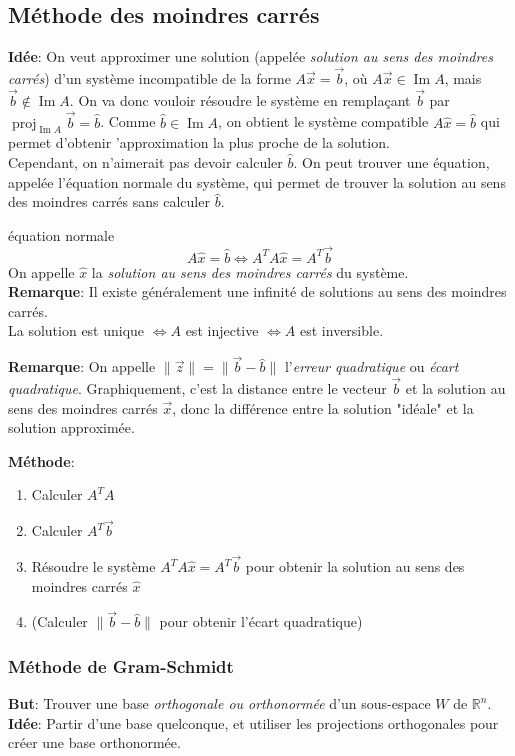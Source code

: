 \documentclass{article}
\numberwithin{equation}{section}
\newcommand\thm[1]{\vspace{4px}\noindent \quad {\large \underline{\textsc{Théorème #1}}: }}
\providecommand{\norm}[1]{\lVert#1\rVert}
\DeclareMathOperator{\im}{Im}
\DeclareMathOperator{\proj}{proj}
\begin{document}
\subsection{Méthode des moindres carrés}
\textbf{Idée}: On veut approximer une solution (appelée \emph{solution au sens des moindres carrés}) d'un système incompatible de la forme $A\vec x = \vec b$, où $A\vec x \in \im A$, mais $\vec b \notin \im A$. On va donc vouloir résoudre le système en remplaçant $\vec b$ par $\proj_{\im A} \vec b = \hat b$. Comme $\hat b \in \im A$, on obtient le système compatible $A\hat x = \hat b$ qui permet d'obtenir 'approximation la plus proche de la solution. \\
Cependant, on n'aimerait pas devoir calculer $\hat b$. On peut trouver une équation, appelée l'équation normale du système, qui permet de trouver la solution au sens des moindres carrés sans calculer $\hat b$.

\thm{} équation normale 
\begin{equation}
	\boxed{ A\hat x = \hat b \iff A^TA \hat x = A^T\vec b }
\end{equation}
On appelle $\hat x$ la \emph{solution au sens des moindres carrés} du système. \\

\textbf{Remarque}: Il existe généralement une infinité de solutions au sens des moindres carrés. \\ La solution est unique $\iff A$ est injective $\iff A$ est inversible.

\textbf{Remarque}: On appelle $\norm{\vec z} = \norm{\vec b - \hat b}$ l'\emph{erreur quadratique} ou \emph{écart quadratique}. Graphiquement, c'est la distance entre le vecteur $\vec b$ et la solution au sens des moindres carrés $\vec x$, donc la différence entre la solution "idéale" et la solution approximée.

\textbf{Méthode}:
\begin{enumerate}
	\item Calculer $A^TA$
	\item Calculer $A^T\vec b$
	\item Résoudre le système $A^TA\hat x = A^T\vec b$ pour obtenir la solution au sens des moindres carrés $\hat x$
	\item (Calculer $\norm{\vec b - \hat b}$ pour obtenir l'écart quadratique)
\end{enumerate}

\subsubsection{Méthode de Gram-Schmidt}
\textbf{But}: Trouver une base \emph{orthogonale ou orthonormée} d'un sous-espace $W$ de $\mathbb{R}^n$. \\
\textbf{Idée}: Partir d'une base quelconque, et utiliser les projections orthogonales pour créer une base orthonormée.
\end{document}
